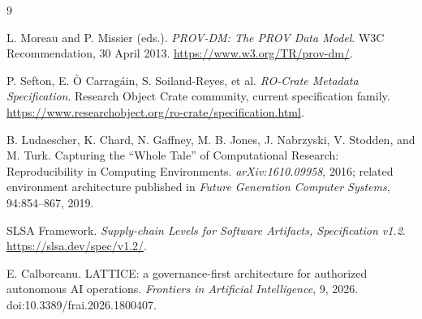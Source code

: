 \documentclass[11pt]{article}
\begin{document}
\begin{thebibliography}{9}

L. Moreau and P. Missier (eds.).
\newblock \emph{PROV-DM: The PROV Data Model}.
\newblock W3C Recommendation, 30 April 2013.
\newblock \url{https://www.w3.org/TR/prov-dm/}.

P. Sefton, E. \`O Carrag\'ain, S. Soiland-Reyes, et al.
\newblock \emph{RO-Crate Metadata Specification}.
\newblock Research Object Crate community, current specification family.
\newblock \url{https://www.researchobject.org/ro-crate/specification.html}.

B. Ludaescher, K. Chard, N. Gaffney, M. B. Jones, J. Nabrzyski, V. Stodden, and M. Turk.
\newblock Capturing the ``Whole Tale'' of Computational Research: Reproducibility in Computing Environments.
\newblock \emph{arXiv:1610.09958}, 2016; related environment architecture published in \emph{Future Generation Computer Systems}, 94:854--867, 2019.

SLSA Framework.
\newblock \emph{Supply-chain Levels for Software Artifacts, Specification v1.2}.
\newblock \url{https://slsa.dev/spec/v1.2/}.

E. Calboreanu.
\newblock LATTICE: a governance-first architecture for authorized autonomous AI operations.
\newblock \emph{Frontiers in Artificial Intelligence}, 9, 2026.
\newblock doi:10.3389/frai.2026.1800407.

\end{thebibliography}
\end{document}
